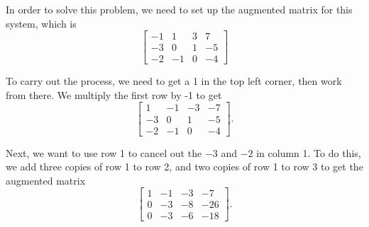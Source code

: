 \documentclass{ximera}
\begin{document}
\begin{exampleSol}
    In order to solve this problem, we need to set up the augmented matrix for this system, which is
    \begin{equation*}
        \left[
            \begin{array}{ccc|c}
                -1 & 1 & 3 & 7 \\
                -3 & 0 & 1 & -5 \\
                -2 & -1 & 0 & -4
            \end{array}
        \right]
    \end{equation*}
    
    To carry out the process, we need to get a 1 in the top left corner, then work from there. We multiply the first row by -1 to get 
    \begin{equation*}
        \left[
            \begin{array}{ccc|c}
                1 & -1 & -3 & -7 \\
                -3 & 0 & 1 & -5 \\
                -2 & -1 & 0 & -4
            \end{array}
        \right].
    \end{equation*}
    
    Next, we want to use row 1 to cancel out the $-3$ and $-2$ in column 1. To do this, we add three copies of row 1 to row 2, and two copies of row 1 to row 3 to get the augmented matrix
    \begin{equation*}
        \left[
            \begin{array}{ccc|c}
                1 & -1 & -3 & -7 \\
                0 & -3 & -8 & -26 \\
                0 & -3 & -6 & -18
            \end{array}
        \right].
    \end{equation*}
    

\end{exampleSol}
\end{document}

